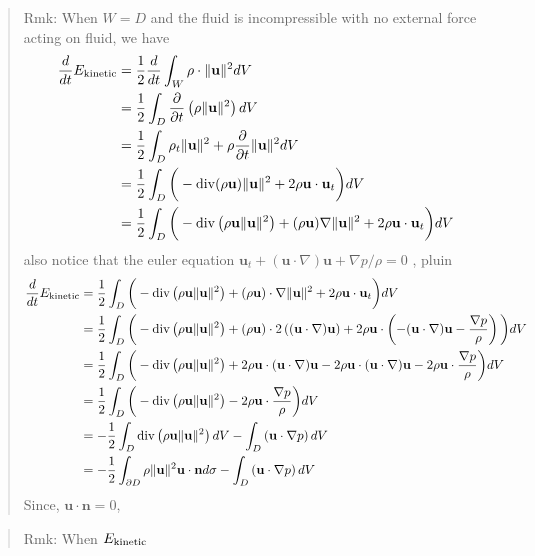 \begin{quote}
	Rmk:
When $W = D$ and the fluid is incompressible with no external force acting on fluid, we have
\begin{equation}
\begin{aligned}
\frac{d}{dt}E_{\rm kinetic}
&= \frac{1}{2}\frac{d}{dt}\int_{W}\rho \cdot \lVert\textbf{u}\rVert^2 dV\\
&= \frac{1}{2}\int_{D}\frac{\partial}{\partial t}\left(\rho \lVert\textbf{u}\rVert^2\right)dV\\
&= \frac{1}{2}\int_{D}\rho_t \lVert\textbf{u}\rVert^2 + \rho \frac{\partial}{\partial t} \lVert\textbf{u}\rVert^2 dV\\
&= \frac{1}{2}\int_{D} \bigg(
-\operatorname{div}(\rho\textbf{u})\lVert\textbf{u}\rVert^2
+2\rho \textbf{u}\cdot \textbf{u}_t
\bigg)dV\\
&= \frac{1}{2}\int_{D} \bigg(
-\operatorname{div}\left(\rho\textbf{u}\lVert\textbf{u}\rVert^2\right)
+(\rho\textbf{u})\nabla\lVert\textbf{u}\rVert^2
+2\rho \textbf{u}\cdot \textbf{u}_t
\bigg)dV
\end{aligned}
\end{equation}
also notice that the euler equation $\textbf{u}_t+(\textbf{u}\cdot \nabla)\textbf{u}+\nabla p/\rho=0$ , pluin
\begin{equation}
\begin{aligned}
\frac{d}{dt}E_{\rm kinetic}
&= \frac{1}{2}\int_{D} \bigg(
-\operatorname{div}\left(\rho\textbf{u}\lVert\textbf{u}\rVert^2\right)
+(\rho\textbf{u})\cdot\nabla\lVert\textbf{u}\rVert^2
+2\rho \textbf{u}\cdot \textbf{u}_t
\bigg)dV\\
&= \frac{1}{2}\int_{D} \bigg(
-\operatorname{div}\left(\rho\textbf{u}\lVert\textbf{u}\rVert^2\right)
+(\rho\textbf{u})\cdot 2\left((\textbf{u}\cdot \nabla) \textbf{u}\right)
+2\rho \textbf{u}\cdot\left(-(\textbf{u}\cdot \nabla)\textbf{u}-\frac{\nabla p}{\rho}\right)
\bigg)dV\\
&= \frac{1}{2}\int_{D} \bigg(
-\operatorname{div}\left(\rho\textbf{u}\lVert\textbf{u}\rVert^2\right)
+2\rho\textbf{u}\cdot(\textbf{u}\cdot \nabla) \textbf{u}
-2\rho \textbf{u}\cdot(\textbf{u}\cdot \nabla)\textbf{u}
-2\rho \textbf{u}\cdot\frac{\nabla p}{\rho}
\bigg)dV\\
&= \frac{1}{2}\int_{D} \bigg(
-\operatorname{div}\left(\rho\textbf{u}\lVert\textbf{u}\rVert^2\right)
-2\rho \textbf{u}\cdot\frac{\nabla p}{\rho}
\bigg)dV\\
&= -\frac{1}{2}\int_{D}
\operatorname{div}\left(\rho\textbf{u}\lVert\textbf{u}\rVert^2\right)dV
-\int_{D}\left(\textbf{u}\cdot\nabla p\right)dV\\
&= -\frac{1}{2}\int_{\partial D}
\rho\lVert\textbf{u}\rVert^2\textbf{u}\cdot\textbf{n}d\sigma
-\int_{D}\left(\textbf{u}\cdot\nabla p\right)dV\\
\end{aligned}
\end{equation}
Since, $\textbf{u}\cdot\textbf{n} = 0$,
\end{quote}



\begin{quote}
	Rmk:
When $E_{\rm kinetic}$
\end{quote}

